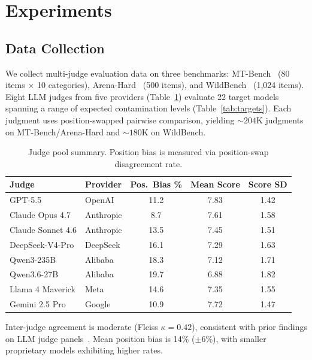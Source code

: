 \documentclass[11pt]{article}
\begin{document}
\section{Experiments}
\label{sec:experiments}

\subsection{Data Collection}
\label{sec:data}

We collect multi-judge evaluation data on three benchmarks: MT-Bench~\citep{zheng2023judging} (80 items $\times$ 10 categories), Arena-Hard~\citep{li2024arenahard} (500 items), and WildBench~\citep{lin2024wildbench} (1{,}024 items). Eight LLM judges from five providers (Table~\ref{tab:judges}) evaluate 22 target models spanning a range of expected contamination levels (Table~\ref{tab:targets}). Each judgment uses position-swapped pairwise comparison, yielding ${\sim}204$K judgments on MT-Bench/Arena-Hard and ${\sim}180$K on WildBench.

\begin{table}[t]
\centering
\caption{Judge pool summary. Position bias is measured via position-swap disagreement rate.}
\label{tab:judges}
\small
\begin{tabular}{@{}llccc@{}}
\toprule
Judge & Provider & Pos.\ Bias \% & Mean Score & Score SD \\
\midrule
GPT-5.5 & OpenAI & 11.2 & 7.83 & 1.42 \\
Claude Opus 4.7 & Anthropic & 8.7 & 7.61 & 1.58 \\
Claude Sonnet 4.6 & Anthropic & 13.5 & 7.45 & 1.51 \\
DeepSeek-V4-Pro & DeepSeek & 16.1 & 7.29 & 1.63 \\
Qwen3-235B & Alibaba & 18.3 & 7.12 & 1.71 \\
Qwen3.6-27B & Alibaba & 19.7 & 6.88 & 1.82 \\
Llama 4 Maverick & Meta & 14.6 & 7.35 & 1.55 \\
Gemini 2.5 Pro & Google & 10.9 & 7.72 & 1.47 \\
\bottomrule
\end{tabular}
\end{table}

Inter-judge agreement is moderate (Fleiss $\kappa = 0.42$), consistent with prior findings on LLM judge panels~\citep{zheng2023judging}. Mean position bias is 14\% ($\pm$6\%), with smaller proprietary models exhibiting higher rates.
\end{document}

